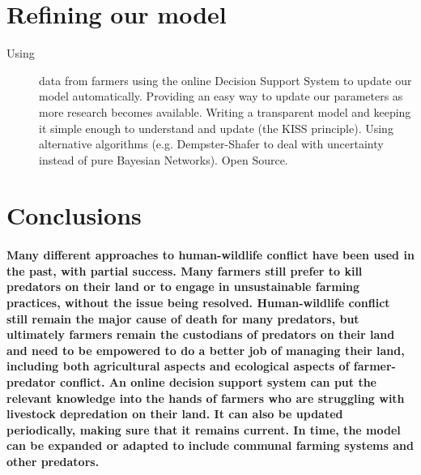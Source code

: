 \section{Refining our model}
\begin{description}
\item [{Using}] data from farmers using the online Decision Support System
to update our model automatically. Providing an easy way to update
our parameters as more research becomes available. Writing a transparent
model and keeping it simple enough to understand and update (the KISS
principle). Using alternative algorithms (e.g. Dempster-Shafer to
deal with uncertainty instead of pure Bayesian Networks). Open Source.
\end{description}

\section{Conclusions}

\paragraph{Many different approaches to human-wildlife conflict have been used
in the past, with partial success. Many farmers still prefer to kill
predators on their land or to engage in unsustainable farming practices,
without the issue being resolved. Human-wildlife conflict still remain
the major cause of death for many predators, but ultimately farmers
remain the custodians of predators on their land and need to be empowered
to do a better job of managing their land, including both agricultural
aspects and ecological aspects of farmer-predator conflict. An online
decision support system can put the relevant knowledge into the hands
of farmers who are struggling with livestock depredation on their
land. It can also be updated periodically, making sure that it remains
current. In time, the model can be expanded or adapted to include
communal farming systems \citep{Blackburn_et_al_2016} and other predators.}





